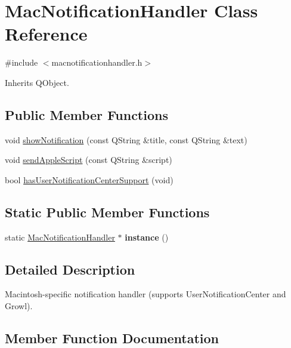\hypertarget{class_mac_notification_handler}{}\section{Mac\+Notification\+Handler Class Reference}
\label{class_mac_notification_handler}


{\ttfamily \#include $<$macnotificationhandler.\+h$>$}



Inherits Q\+Object.

\subsection*{Public Member Functions}
\begin{DoxyCompactItemize}
\item 
void \mbox{\hyperlink{class_mac_notification_handler_abeb9b3a7c81397499fbb7e1d24610cd9}{show\+Notification}} (const Q\+String \&title, const Q\+String \&text)
\item 
void \mbox{\hyperlink{class_mac_notification_handler_a39051c00850f7b6cb644cdb60006dc2e}{send\+Apple\+Script}} (const Q\+String \&script)
\item 
bool \mbox{\hyperlink{class_mac_notification_handler_a132cba3b7df82afd3b07ca08599b94a5}{has\+User\+Notification\+Center\+Support}} (void)
\end{DoxyCompactItemize}
\subsection*{Static Public Member Functions}
\begin{DoxyCompactItemize}
\item 
\mbox{\label{class_mac_notification_handler_a8ba83adcb63db47e3f7a76a0afc02b9d}} 
static \mbox{\hyperlink{class_mac_notification_handler}{Mac\+Notification\+Handler}} $\ast$ {\bfseries instance} ()
\end{DoxyCompactItemize}


\subsection{Detailed Description}
Macintosh-\/specific notification handler (supports User\+Notification\+Center and Growl). 

\subsection{Member Function Documentation}
\mbox{\label{class_mac_notification_handler_a132cba3b7df82afd3b07ca08599b94a5}} 
